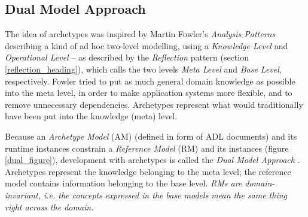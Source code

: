 %
%
%
%
%
%
%

\subsection{Dual Model Approach}
\label{dual_model_approach_heading}

The idea of archetypes was inspired by Martin Fowler's \emph{Analysis Patterns}
\cite{fowler1997} describing a kind of ad hoc two-level modelling, using a
\emph{Knowledge Level} and \emph{Operational Level} -- as described by the
\emph{Reflection} pattern (section \ref{reflection_heading}), which calls the
two levels \emph{Meta Level} and \emph{Base Level}, respectively. Fowler tried
to put as much general domain knowledge as possible into the meta level, in
order to make application systems more flexible, and to remove unnecessary
dependencies. Archetypes represent what would traditionally have been put into
the knowledge (meta) level.

Because an \emph{Archetype Model} (AM) (defined in form of ADL documents) and
its runtime instances constrain a \emph{Reference Model} (RM) and its instances
(figure \ref{dual_figure}), development with archetypes is called the
\emph{Dual Model Approach} \cite{openehr}. Archetypes represent the knowledge
belonging to the meta level; the reference model contains information belonging
to the base level. \textit{RMs are domain-invariant, i.e. the concepts
expressed in the base models mean the same thing right across the domain.}
\cite[Beale]{openehrtechnical}

